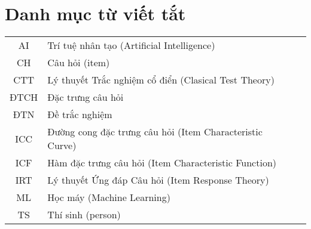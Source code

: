 \chapter*{Danh mục từ viết tắt}
\begin{longtable}{SlSl}
	AI & Trí tuệ nhân tạo (Artificial Intelligence)\\
	CH & Câu hỏi (item)\\
	CTT & Lý thuyết Trắc nghiệm cổ điển (Clasical Test Theory)\\
	ĐTCH & Đặc trưng câu hỏi\\
	ĐTN & Đề trắc nghiệm\\
	ICC & Đường cong đặc trưng câu hỏi (Item Characteristic Curve)\\
	ICF & Hàm đặc trưng câu hỏi (Item Characteristic Function)\\
	IRT & Lý thuyết Ứng đáp Câu hỏi (Item Response Theory)\\
	ML & Học máy (Machine Learning)\\
	TS & Thí sinh (person)\\
\end{longtable}
